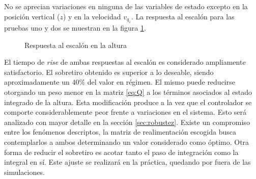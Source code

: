 \documentclass[main]{subfiles}
\begin{document}
No se aprecian variaciones en ninguna de las variables de estado excepto en la posici\'on vertical ($z$) y en la velocidad $v_{q_z}$. La respuesta al escal\'on para las pruebas uno y dos se muestran en la figura \ref{fig:hov_esc_z}. 
\begin{figure}
  \centering
  \caption{Respuesta al escal\'on en la altura}
  \label{fig:hov_esc_z}
\end{figure}

El tiempo de \emph{rise} de ambas respuestas al escal\'on es considerado ampliamente satisfactorio. El sobretiro obtenido es superior a lo deseable, siendo aproximadamente un $40\%$ del valor en r\'egimen. El mismo puede reducirse otorgando un peso menor en la matriz \ref{eq:Q} a los t\'erminos asociados al estado integrado de la altura. Esta modificaci\'on produce a la vez que el controlador se comporte considerablemente peor frente a variaciones en el sistema. Esto ser\'a analizado con mayor detalle en la secci\'on \ref{sec:robustez}. Existe un compromiso entre los fen\'omenos descriptos, la matriz de realimentaci\'on escogida busca contemplarlos a ambos determinando un valor considerado como \'optimo. Otra forma de reducir el sobretiro es acotar tanto el paso de integraci\'on como la integral en s\'i. Este ajuste se realizar\'a en la pr\'actica, quedando por fuera de las simulaciones.\\ 
\end{document}

